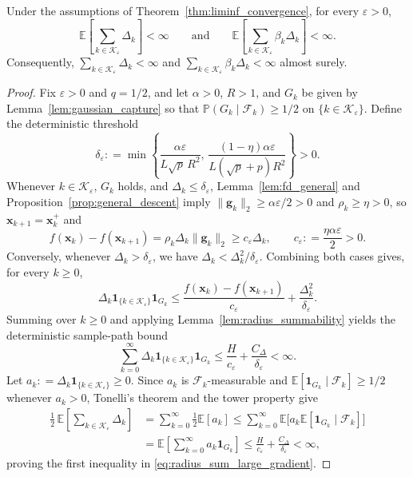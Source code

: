 \documentclass[smallextended]{svjour3}
\newcommand{\bx}{\bm{x}}
\newcommand{\bg}{\bm{g}}
\providecommand{\coloneqq}{\mathrel{\mathop:}=}
\begin{document}
\begin{lemma}
\label{lem:radius_sum_large_gradient}
Under the assumptions of Theorem~\ref{thm:liminf_convergence}, for every $\varepsilon>0$,
\begin{equation}
\label{eq:radius_sum_large_gradient}
\mathbb E\left[\sum_{k\in\mathcal K_\varepsilon}\Delta_k\right] < \infty
\qquad\text{and}\qquad
\mathbb E\left[\sum_{k\in\mathcal K_\varepsilon}\beta_k\Delta_k\right] < \infty.
\end{equation}
Consequently, $\sum_{k\in\mathcal K_\varepsilon}\Delta_k < \infty$ and $\sum_{k\in\mathcal K_\varepsilon}\beta_k\Delta_k < \infty$ almost surely.
\end{lemma}

\begin{proof}
Fix $\varepsilon>0$ and $q=1/2$, and let $\alpha>0$, $R>1$, and $G_k$ be given by Lemma~\ref{lem:gaussian_capture} so that $\mathbb P(G_k\mid\mathcal F_k) \ge 1/2$ on $\{k \in \mathcal K_\varepsilon\}$. Define the deterministic threshold
\[
\delta_\varepsilon \coloneqq \min\left\{ \frac{\alpha\varepsilon}{L\sqrt p\,R^2},\, \frac{(1-\eta)\alpha\varepsilon}{L(\sqrt p+p)R^2} \right\} > 0.
\]
Whenever $k\in\mathcal K_\varepsilon$, $G_k$ holds, and $\Delta_k \le \delta_\varepsilon$, Lemma~\ref{lem:fd_general} and Proposition~\ref{prop:general_descent} imply $\|\bg_k\|_2 \ge \alpha\varepsilon/2 > 0$ and $\rho_k \ge \eta > 0$, so $\bx_{k+1}=\bx_k^+$ and
\[
f(\bx_k) - f(\bx_{k+1}) = \rho_k \Delta_k \|\bg_k\|_2 \ge c_\varepsilon \Delta_k, \qquad c_\varepsilon \coloneqq \frac{\eta\alpha\varepsilon}{2} > 0.
\]
Conversely, whenever $\Delta_k > \delta_\varepsilon$, we have $\Delta_k < \Delta_k^2/\delta_\varepsilon$. Combining both cases gives, for every $k\ge 0$,
\[
\Delta_k \mathbf{1}_{\{k\in\mathcal K_\varepsilon\}} \mathbf{1}_{G_k} \le \frac{f(\bx_k)-f(\bx_{k+1})}{c_\varepsilon} + \frac{\Delta_k^2}{\delta_\varepsilon}.
\]
Summing over $k\ge 0$ and applying Lemma~\ref{lem:radius_summability} yields the deterministic sample-path bound
\[
\sum_{k=0}^{\infty} \Delta_k \mathbf{1}_{\{k\in\mathcal K_\varepsilon\}} \mathbf{1}_{G_k} \le \frac{H}{c_\varepsilon} + \frac{C_\Delta}{\delta_\varepsilon} < \infty.
\]
Let $a_k \coloneqq \Delta_k \mathbf{1}_{\{k\in\mathcal K_\varepsilon\}} \ge 0$. Since $a_k$ is $\mathcal F_k$-measurable and $\mathbb E[\mathbf{1}_{G_k}\mid\mathcal F_k] \ge 1/2$ whenever $a_k > 0$, Tonelli's theorem and the tower property give
\[
\begin{aligned}
\frac{1}{2}\,\mathbb E\left[\sum_{k\in\mathcal K_\varepsilon}\Delta_k\right]
&= \sum_{k=0}^{\infty} \frac{1}{2}\mathbb E[a_k]
\le \sum_{k=0}^{\infty} \mathbb E\bigl[a_k \mathbb E[\mathbf{1}_{G_k}\mid\mathcal F_k]\bigr] \\
&= \mathbb E\left[\sum_{k=0}^{\infty} a_k\mathbf{1}_{G_k}\right]
\le \frac{H}{c_\varepsilon} + \frac{C_\Delta}{\delta_\varepsilon} < \infty,
\end{aligned}
\]
proving the first inequality in \eqref{eq:radius_sum_large_gradient}.


\end{proof}
\end{document}
